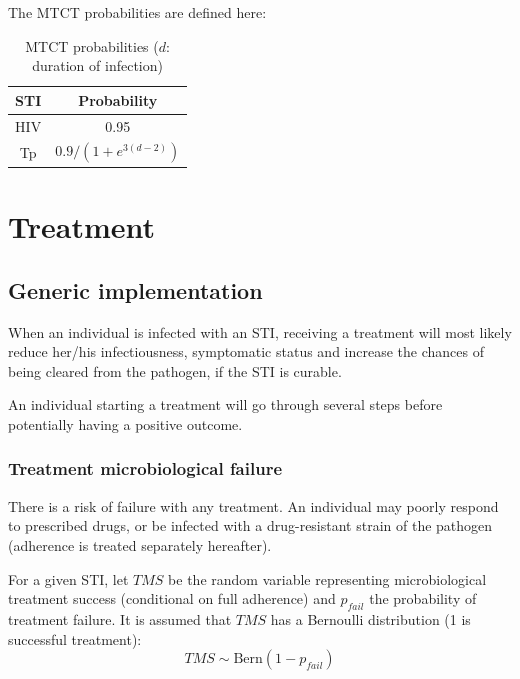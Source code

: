 \documentclass[11pt, onecolumn]{article}
\begin{document}
The MTCT probabilities are defined here:

\begin{table}[htdp]
\caption{MTCT probabilities ($d$: duration of infection)}
\begin{center}
\begin{tabular}{|c|c|}
\hline
STI & Probability \\
\hline
HIV & 0.95 \\
Tp & $0.9/\left(1+e^{3(d-2)}\right)$  \\
\hline
\end{tabular}
\end{center}
\label{default}
\end{table}%




\section{Treatment}


\subsection{Generic implementation}

When an individual is infected with an STI, receiving a treatment will most likely reduce her/his infectiousness, symptomatic status and increase the chances of being cleared from the pathogen, if the STI is curable.

An individual starting a treatment will go through several steps before potentially having a positive outcome. 

\subsubsection{Treatment microbiological failure}

There is a risk of failure with any treatment. An individual may poorly respond to prescribed drugs, or be infected with a drug-resistant strain of the pathogen (adherence is treated separately hereafter).

For a given STI, let $TMS$ be the random variable representing microbiological treatment success (conditional on full adherence) and $p_{fail}$ the probability of treatment failure. It is assumed that $TMS$ has a Bernoulli distribution (1 is successful treatment):
$$TMS \sim \mathrm{Bern}(1- p_{fail})$$
\end{document}
